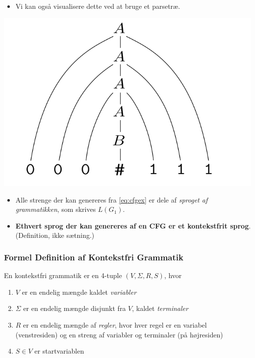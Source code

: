 \begin{frame}[allowframebreaks]
\begin{itemize}
    \item Vi kan også visualisere dette ved at bruge et parsetræ.
  \end{itemize}
  \begin{center}
    \includegraphics[scale=0.3]{figur/figur21.png}
  \end{center}
  \begin{itemize}
    \item Alle strenge der kan genereres fra \eqref{eq:cfgex} er dele af \textit{sproget af grammatikken}, som skrives $L(G_{1})$.
    \item \textbf{Ethvert sprog der kan genereres af en CFG er et kontekstfrit sprog}. (Definition, ikke sætning.)
  \end{itemize}
\end{frame}

\begin{frame}
  \frametitle{Formel Definition af Kontekstfri Grammatik}
\begin{definition}
  En kontekstfri grammatik er en 4-tuple $(V, \Sigma, R, S)$, hvor
  \begin{enumerate}
    \item $V$ er en endelig mængde kaldet \textit{variabler}
    \item $\Sigma$ er en endelig mængde disjunkt fra $V$, kaldet \textit{terminaler}
    \item $R$ er en endelig mængde af \textit{regler}, hvor hver regel er en variabel (venstresiden) og en streng af variabler og terminaler (på højresiden)
    \item $S \in V$ er startvariablen
  \end{enumerate}
\end{definition}
\end{frame}

